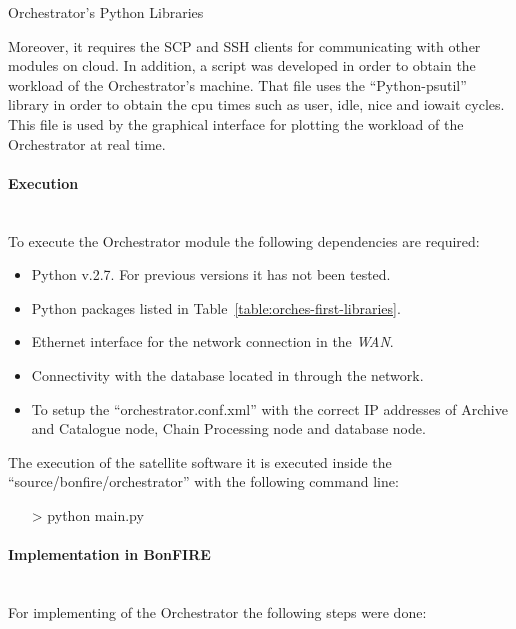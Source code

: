 \begin{table}[hp]
  \centering
  {\small
  
  }
  \caption{Orchestrator’s Python Libraries}
  \label{table:orches-first-libraries}
\end{table}

Moreover, it requires the \ac{SCP} and \ac{SSH} clients for communicating  with other
modules on cloud.
In addition, a script was developed in order to obtain the workload of the
Orchestrator's machine. That file uses the ``Python-psutil'' library in order to
obtain the cpu times such as user, idle, nice and iowait cycles. This file is
used by the graphical interface for plotting the workload of the Orchestrator at
real time.


\paragraph{Execution}~\\

To execute the Orchestrator module the following dependencies are required:
\begin{itemize}
\item Python v.2.7. For previous versions it has not been tested.
\item Python packages listed in Table~\ref{table:orches-first-libraries}.
\item Ethernet interface for the network connection in the \bonfire \emph{WAN}.
\item Connectivity with the database located in \bonfire through the network.
\item To setup the ``orchestrator.conf.xml'' with the correct \ac{IP} addresses
  of Archive and Catalogue node, Chain Processing node and database node.
\end{itemize}

The execution of the satellite software it is executed inside the
``source/bonfire/orchestrator'' with the following
command line:
\begin{itemize}
\item[>] python main.py
\end{itemize}
 
\paragraph{Implementation in BonFIRE}~\\

For implementing of the Orchestrator the following steps were done:

